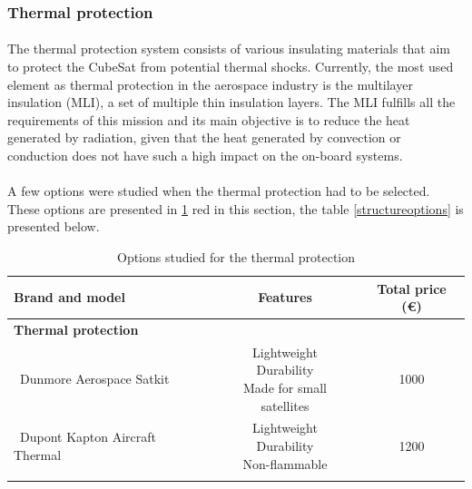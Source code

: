 \subsubsection{Thermal protection}\label{Appendix:Thermal}
\paragraph{}The thermal protection system consists of various insulating materials that aim to protect the CubeSat from potential thermal shocks. Currently, the most used element as thermal protection in the aerospace industry is the multilayer insulation (MLI), a set of multiple thin insulation layers. The MLI fulfills all the requirements of this mission and its main objective is to reduce the heat generated by radiation, given that the heat generated by convection or conduction does not have such a high impact on the on-board systems.

\paragraph{}A few options were studied when the thermal protection had to be selected. These options are presented in \ref{thermaloptions}
red in this section, the table \ref{structureoptions} is presented below.

\begin{longtable}{| l | c | c | }
\hline
\rowcolor[gray]{0.80}	\textbf{Brand and model} &  \textbf{Features}     & \textbf{Total price (\euro)}   \\
\hline
\endfirsthead
\rowcolor[gray]{0.85} \textbf{Thermal protection} &  &  \\
	   ~Dunmore Aerospace Satkit & \makecell{Lightweight \\ Durability \\ Made for small satellites}& 1000 \\
	   \hline
	   ~Dupont Kapton Aircraft Thermal & \makecell{Lightweight \\ Durability \\ Non-flammable} & 1200 \\
	\hline

\caption{Options studied for the thermal protection}
\label{thermaloptions}
\end{longtable}
